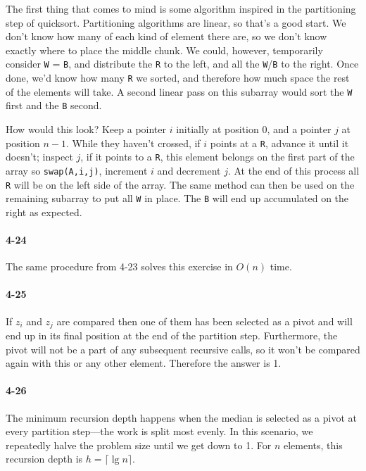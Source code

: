 \documentclass{report}
\newcommand{\li}{\lstinline}
\begin{document}
The first thing that comes to mind is some algorithm inspired in the partitioning step of quicksort. Partitioning algorithms are linear, so that's a good start. We don't know how many of each kind of element there are, so we don't know exactly where to place the middle chunk. We could, however, temporarily consider \li!W! = \li!B!, and distribute the \li!R! to the left, and all the \li!W!/\li!B! to the right. Once done, we'd know how many \li!R! we sorted, and therefore how much space the rest of the elements will take. A second linear pass on this subarray would sort the \li!W! first and the \li!B! second.

\smallskip

How would this look? Keep a pointer $i$ initially at position 0, and a pointer $j$ at position $n-1$. While they haven't crossed, if $i$ points at a \li!R!, advance it until it doesn't; inspect $j$, if it points to a \li!R!, this element belongs on the first part of the array so \li!swap(A,i,j)!, increment $i$ and decrement $j$. At the end of this process all \li!R! will be on the left side of the array. The same method can then be used on the remaining subarray to put all \li!W! in place. The \li!B! will end up accumulated on the right as expected.

\paragraph{4-24} The same procedure from 4-23 solves this exercise in $O(n)$ time.

\paragraph{4-25} If $z_i$ and $z_j$ are compared then one of them has been selected as a pivot and will end up in its final position at the end of the partition step. Furthermore, the pivot will not be a part of any subsequent recursive calls, so it won't be compared again with this or any other element. Therefore the answer is 1.

\paragraph{4-26} The minimum recursion depth happens when the median is selected as a pivot at every partition step---the work is split most evenly. In this scenario, we repeatedly halve the problem size until we get down to 1. For $n$ elements, this recursion depth is $h=\lceil\lg n\rceil$.
\end{document}
